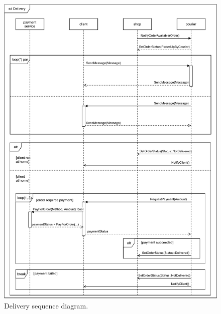 \documentclass[../main.tex]{subfiles}
\begin{document}
\begin{figure}
\caption{Delivery sequence diagram.}
\centering
\includegraphics[width=\textwidth]
{diagrams/sequence-diagrams/Courier.pdf}
\end{figure}
\end{document}
